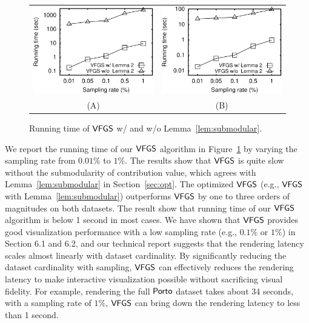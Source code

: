 \begin{figure}
 \centering
 \small
 \begin{tabular}{cc}
   \includegraphics[width=0.44\columnwidth]{pictures/tporto}
   &
   \includegraphics[width=0.44\columnwidth]{pictures/tshenzhen}
   \\
   (A) \pt{}
   &
   (B) \sz{}	
 \end{tabular}
 \vspace{-3mm}
 \caption{Running time of $\mathsf{VFGS}$ w/ and w/o Lemma~\ref{lem:submodular}.}
 \label{fig:cost}
 \vspace{-3mm}
\end{figure}


 We report the running time of our $\mathsf{VFGS}$ algorithm in Figure~\ref{fig:cost} by varying the sampling rate from $0.01\%$ to $1\%$. The results show that $\mathsf{VFGS}$ is quite slow without the submodularity of contribution value, which agrees with Lemma~\ref{lem:submodular} in Section~\ref{sec:opt}.
The optimized $\mathsf{VFGS}$ (e.g., $\mathsf{VFGS}$ with Lemma~\ref{lem:submodular}) outperforms $\mathsf{VFGS}$ by one to three orders of magnitudes on both datasets. The result show that running time of our $\mathsf{VFGS}$ algorithm is below 1 second in most cases. We have shown that $\mathsf{VFGS}$ provides good visualization performance with a low sampling rate (e.g., $0.1\%$ or $1\%$) in Section 6.1 and 6.2, and our technical report suggests that the rendering latency scales almost linearly with dataset cardinality. By significantly reducing the dataset cardinality with sampling, $\mathsf{VFGS}$ can effectively reduces the rendering latency to make interactive visualization possible without sacrificing visual fidelity. For example, rendering the full $\textsf{Porto}{}$ dataset takes about 34 seconds, with a sampling rate of $1\%$, $\mathsf{VFGS}$ can bring down the rendering latency to less than 1 second.




